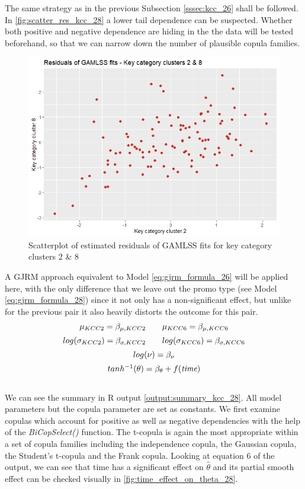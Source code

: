 
The same strategy as in the previous Subsection \ref{sssec:kcc_26} shall be followed. In \autoref{fig:scatter_res_kcc_28} a lower tail dependence can be suspected. Whether both positive and negative dependence are hiding in the the data will be tested beforehand, so that we can narrow down the number of plausible copula families.
\\

\begin{figure}[H]
\centering
  \includegraphics[width=0.45\linewidth]{figures/scatter_res_kcc_28.png}
  \caption{Scatterplot of estimated residuals of GAMLSS fits for key category clusters 2 \& 8}
  \label{fig:scatter_res_kcc_28}
\end{figure}


A \ac{GJRM} approach equivalent to Model \ref{eq:gjrm_formula_26} will be applied here, with the only difference that we leave out the promo type (see Model \ref{eq:gjrm_formula_28}) since it not only has a non-significant effect, but unlike for the previous pair it also heavily distorts the outcome for this pair. \\
\begin{equation}
\begin{array}{c}
\mu_{KCC 2}=\beta_{\mu,KCC2} \qquad \mu_{KCC 6}=\beta_{\mu,KCC6}  \\  \noalign{\vskip5pt}

log(\sigma_{KCC 2})=\beta_{\sigma,KCC2} \qquad log(\sigma_{KCC 6})=\beta_{\sigma,KCC6} \\  \noalign{\vskip5pt}

log(\nu) = \beta_{\nu} \\  \noalign{\vskip5pt}

tanh^{-1}(\theta)=\beta_{\theta}  +f(\textit{time})
\end{array}
\label{eq:gjrm_formula_28}
\end{equation} \\
We can see the summary in R output \ref{output:summary_kcc_28}. All model parameters but the copula parameter are set as constants. We first examine copulas which account for positive as well as negative dependencies with the help of the \textit{BiCopSelect()} function. The t-copula is again the most appropriate within a set of copula families including the independence copula, the Gaussian copula, the Student's t-copula and the Frank copula. Looking at equation 6 of the output, we can see that time has a significant effect on $\hat{\theta}$ and its partial smooth effect can be checked visually in \autoref{fig:time_effect_on_theta_28}.
\\




